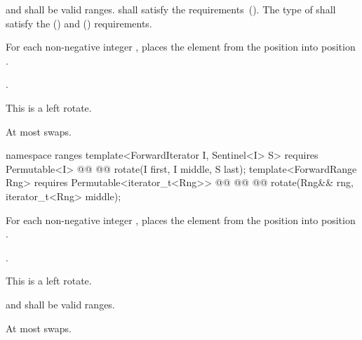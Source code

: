 
\begin{itemdescr}
\pnum
\requires
{}
and
shall be valid ranges.
 shall satisfy the
 requirements~(). The type of  shall satisfy
the  () and
 () requirements.

\pnum
\effects
For each non-negative integer
,
places the element from the position
into position
.

\pnum
\returns {}.

\pnum
\remarks
This is a left rotate.

\pnum
\complexity
At most
swaps.
\end{itemdescr}

\begin{addedblock}
%
\begin{itemdecl}
namespace ranges {
  template<ForwardIterator I, Sentinel<I> S>
    requires Permutable<I>
    @@
    @@
      rotate(I first, I middle, S last);
  template<ForwardRange Rng>
    requires Permutable<iterator_t<Rng>>
    @@
                @@
    @@
      rotate(Rng&& rng, iterator_t<Rng> middle);
}
\end{itemdecl}

\begin{itemdescr}
\pnum
\effects
For each non-negative integer
,
places the element from the position
into position
.

\pnum
\returns {}.

\pnum
\remarks
This is a left rotate.

\pnum
\requires
{}
and
shall be valid ranges.

\pnum
\complexity
At most
swaps.
\end{itemdescr}
\end{addedblock}

